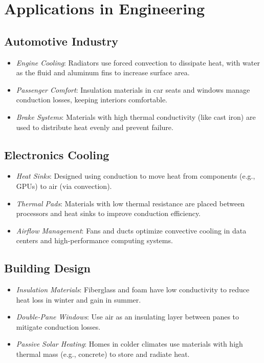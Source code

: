 \documentclass[12pt]{article}
\begin{document}
\section*{Applications in Engineering}
\subsection*{Automotive Industry}
\begin{itemize}
    \item \textit{Engine Cooling}: Radiators use forced convection to dissipate heat, with water as the fluid and aluminum fins to increase surface area.
    \item \textit{Passenger Comfort}: Insulation materials in car seats and windows manage conduction losses, keeping interiors comfortable.
    \item \textit{Brake Systems}: Materials with high thermal conductivity (like cast iron) are used to distribute heat evenly and prevent failure.
\end{itemize}

\subsection*{Electronics Cooling}
\begin{itemize}
    \item \textit{Heat Sinks}: Designed using conduction to move heat from components (e.g., GPUs) to air (via convection).
    \item \textit{Thermal Pads}: Materials with low thermal resistance are placed between processors and heat sinks to improve conduction efficiency.
    \item \textit{Airflow Management}: Fans and ducts optimize convective cooling in data centers and high-performance computing systems.
\end{itemize}

\subsection*{Building Design}
\begin{itemize}
    \item \textit{Insulation Materials}: Fiberglass and foam have low conductivity to reduce heat loss in winter and gain in summer.
    \item \textit{Double-Pane Windows}: Use air as an insulating layer between panes to mitigate conduction losses.
    \item \textit{Passive Solar Heating}: Homes in colder climates use materials with high thermal mass (e.g., concrete) to store and radiate heat.
\end{itemize}
\end{document}
